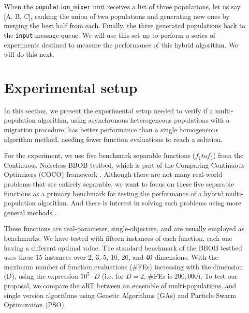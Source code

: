 \documentclass[runningheads]{llncs}
\begin{document}
When the \texttt{population\_mixer} unit receives a list of three
populations, let us say [A, B, C], ranking the union of two
populations and generating new ones by merging the best half from
each. Finally, the three generated 
populations back to the \texttt{input} message queue.
We will use this set up to perform a series of experiments destined to
measure the performance of this hybrid algorithm. We will do this next.



\section{Experimental setup}
\label{setup}

In this section, we present the experimental setup needed 
to verify if a multi-population algorithm, using asynchronous
heterogeneous populations with a migration procedure, has better performance 
than a single homogeneous algorithm method, needing fewer function evaluations to 
reach a solution. %

For the experiment, we use five
benchmark separable functions ($f_1 to f_5 $) from the Continuous Noiseless
BBOB testbed, which is part of the Comparing Continuous Optimizers (COCO)
framework \cite{hansen2016coco}. Although there are not many real-world
problems that are entirely separable, we want to focus on these five separable functions
as a primary benchmark for testing the performance of a hybrid multi-population
algorithm. And there is interest in solving such problems using more
general methods \cite{doerr2013evolutionary,swarzberg1994step}. 

These functions are real-parameter, single-objective, and are
usually employed as benchmarks. We have tested with fifteen instances of each
function, each one having a different optimal value. The standard benchmark of
the BBOB testbed %
uses these 15 instances over 2, 3, 5, 10, 20, and
40 dimensions. With the maximum number of function evaluations (\#FEs)
increasing with the dimension (D), using the expression $10^5 \cdot D$ (i.e.
for $D = 2$, \#FEs is $200,000$).
%
To test our proposal, we compare the aRT between 
an ensemble of multi-populations,  and single version algorithms using Genetic Algorithms
(GAs) and Particle Swarm Optimization (PSO).
\end{document}
